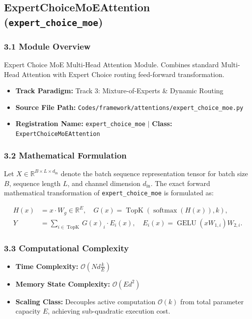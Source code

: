 \subsection{ExpertChoiceMoEAttention (\texttt{expert\_choice\_moe})}
\label{sec:app_module_expert\_choice\_moe}

\subsubsection*{3.1 Module Overview}
Expert Choice MoE Multi-Head Attention Module. Combines standard Multi-Head Attention with Expert Choice routing feed-forward transformation.
\begin{itemize}
    \item \textbf{Track Paradigm:} Track 3: Mixture-of-Experts & Dynamic Routing
    \item \textbf{Source File Path:} \texttt{Codes/framework/attentions/expert\_choice\_moe.py}
    \item \textbf{Registration Name:} \texttt{expert\_choice\_moe} $\mid$ \textbf{Class:} \texttt{ExpertChoiceMoEAttention}
\end{itemize}

\subsubsection*{3.2 Mathematical Formulation}
Let $X \in \mathbb{R}^{B \times L \times d_{\text{in}}}$ denote the batch sequence representation tensor for batch size $B$, sequence length $L$, and channel dimension $d_{\text{in}}$. The exact forward mathematical transformation of \texttt{expert\_choice\_moe} is formulated as:

\begin{align}
H(x) &= x \cdot W_g \in \mathbb{R}^{E}, \quad G(x) = \operatorname{TopK}\left(\operatorname{softmax}(H(x)), k\right), \\
Y &= \sum_{i \in \operatorname{TopK}} G(x)_i \cdot E_i(x), \quad E_i(x) = \operatorname{GELU}(x W_{1, i}) W_{2, i}.
\end{align}


\subsubsection*{3.3 Computational Complexity}
\begin{itemize}
    \item \textbf{Time Complexity:} $\mathcal{O}(N d \frac{k}{E})$
    \item \textbf{Memory State Complexity:} $\mathcal{O}(E d^2)$
    \item \textbf{Scaling Class:} Decouples active computation $\mathcal{O}(k)$ from total parameter capacity $E$, achieving sub-quadratic execution cost.
\end{itemize}

